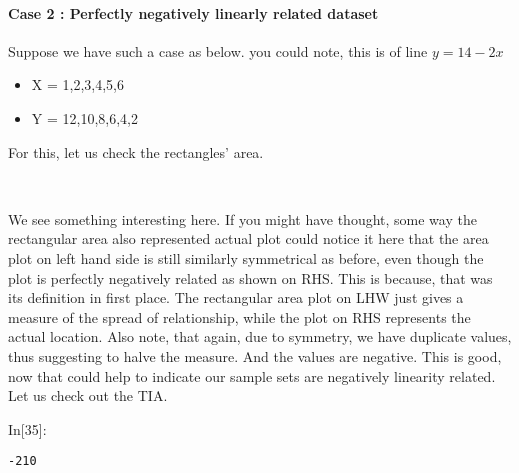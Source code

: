 \documentclass[float=false,crop=false]{standalone}
\begin{document}
    \paragraph{Case 2 : Perfectly negatively linearly related
dataset}\label{case-2-perfectly-negatively-linearly-related-dataset}

Suppose we have such a case as below. you could note, this is of line
\(y=14 - 2x\)

\begin{itemize}
\tightlist
\item
  X = 1,2,3,4,5,6\\
\item
  Y = 12,10,8,6,4,2
\end{itemize}

For this, let us check the rectangles' area.
    \begin{center}
    \end{center}
    { \hspace*{\fill} \\}
    
    We see something interesting here. If you might have thought, some way
the rectangular area also represented actual plot could notice it here
that the area plot on left hand side is still similarly symmetrical as
before, even though the plot is perfectly negatively related as shown on
RHS. This is because, that was its definition in first place. The
rectangular area plot on LHW just gives a measure of the spread of
relationship, while the plot on RHS represents the actual location. Also
note, that again, due to symmetry, we have duplicate values, thus
suggesting to halve the measure. And the values are negative. This is
good, now that could help to indicate our sample sets are negatively
linearity related. Let us check out the TIA.
\begin{InVerbatim}[commandchars=\\\{\},fontsize=\scriptsize]
{\color{incolor}In[{\color{incolor}35}]:}    \PY{p}{[}\PY{p}{]}\PY{p}{[}\PY{p}{]}
\end{InVerbatim}
    \begin{Verbatim}[commandchars=\\\{\},fontsize=\footnotesize]
-210

    \end{Verbatim}
\end{document}
